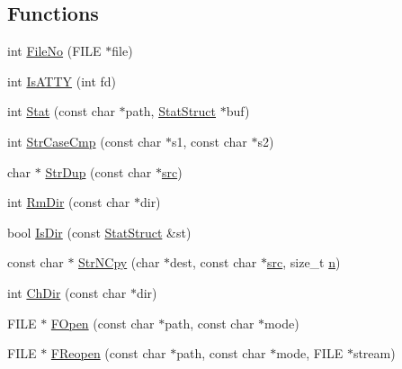 \subsection*{Functions}
\begin{DoxyCompactItemize}
\item 
int \hyperlink{namespacetesting_1_1internal_1_1posix_a3117b067e1f942a2031e666953120ccc}{File\-No} (F\-I\-L\-E $\ast$file)
\item 
int \hyperlink{namespacetesting_1_1internal_1_1posix_a16ebe936b3a8ea462a94191635aedc27}{Is\-A\-T\-T\-Y} (int fd)
\item 
int \hyperlink{namespacetesting_1_1internal_1_1posix_a2b87b7ff647a128614daf50667eb9304}{Stat} (const char $\ast$path, \hyperlink{namespacetesting_1_1internal_1_1posix_a8eb9f08d3af29941c2d2a964cfff3ecb}{Stat\-Struct} $\ast$buf)
\item 
int \hyperlink{namespacetesting_1_1internal_1_1posix_a1ef2385a7f8e4c706054da35967e76bd}{Str\-Case\-Cmp} (const char $\ast$s1, const char $\ast$s2)
\item 
char $\ast$ \hyperlink{namespacetesting_1_1internal_1_1posix_a8e352884793a65ae8be144676f1a9136}{Str\-Dup} (const char $\ast$\hyperlink{legacy_8hpp_a371cd109b74033bc4366f584edd3dacc}{src})
\item 
int \hyperlink{namespacetesting_1_1internal_1_1posix_acbad5d4ea5b73fd1765f5f760642932a}{Rm\-Dir} (const char $\ast$dir)
\item 
bool \hyperlink{namespacetesting_1_1internal_1_1posix_af0d04ed5baeed28353fa38742748a421}{Is\-Dir} (const \hyperlink{namespacetesting_1_1internal_1_1posix_a8eb9f08d3af29941c2d2a964cfff3ecb}{Stat\-Struct} \&st)
\item 
const char $\ast$ \hyperlink{namespacetesting_1_1internal_1_1posix_a36fca815713332e5c6dc92c98b6b2574}{Str\-N\-Cpy} (char $\ast$dest, const char $\ast$\hyperlink{legacy_8hpp_a371cd109b74033bc4366f584edd3dacc}{src}, size\-\_\-t \hyperlink{legacy_8hpp_a76f11d9a0a47b94f72c2d0e77fb32240}{n})
\item 
int \hyperlink{namespacetesting_1_1internal_1_1posix_a1ddc8a4fc6bb21da372307485591a212}{Ch\-Dir} (const char $\ast$dir)
\item 
F\-I\-L\-E $\ast$ \hyperlink{namespacetesting_1_1internal_1_1posix_a4042201dcc4932641d484e7ddf94de7d}{F\-Open} (const char $\ast$path, const char $\ast$mode)
\item 
F\-I\-L\-E $\ast$ \hyperlink{namespacetesting_1_1internal_1_1posix_a9ef6d089cdae03f9d9e0e6d379c40703}{F\-Reopen} (const char $\ast$path, const char $\ast$mode, F\-I\-L\-E $\ast$stream)

\end{DoxyCompactItemize}
